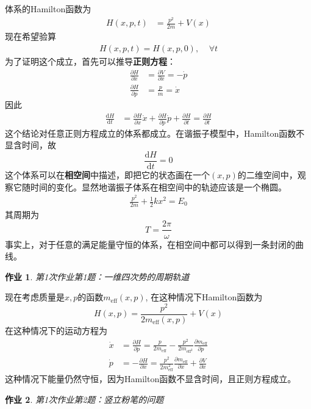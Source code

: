 \documentclass[12pt]{article}
\newtheorem{asg}{作业}
\begin{document}
体系的Hamilton函数为
\begin{align*}
    H(x,p,t) &= \frac {p^2}{2m} + V(x)
\end{align*}
现在希望验算
\begin{align*}
    H(x,p,t) = H(x,p,0),~~~~~\forall t
\end{align*}
为了证明这个成立，首先可以推导\textbf{正则方程}：
\begin{align*}
    \frac {\partial H}{\partial x} &= \frac {\partial V}{\partial x} = -\dot{p}\\
    \frac {\partial H}{\partial p} &= \frac pm = \dot{x}
\end{align*}
因此
\begin{align*}
    \frac {\mathrm{d}H}{\mathrm{d}t} &= \frac {\partial H}{\partial x} \dot{x} + \frac {\partial H}{\partial p} \dot{p} + \frac {\partial H}{\partial t} = \frac {\partial H}{\partial t}
\end{align*}
这个结论对任意正则方程成立的体系都成立。在谐振子模型中，Hamilton函数不显含时间，故
\begin{equation*}
    \frac {\mathrm{d}H}{\mathrm{d}t} = 0
\end{equation*}
这个体系可以在\textbf{相空间}中描述，即把它的状态画在一个$(x,p)$的二维空间中，观察它随时间的变化。显然地谐振子体系在相空间中的轨迹应该是一个椭圆。
\begin{align*}
    \frac {p^2}{2m} + \frac 12 kx^2 = E_0
\end{align*}
其周期为
\begin{equation*}
    T = \frac {2\pi}{\omega}
\end{equation*}
事实上，对于任意的满足能量守恒的体系，在相空间中都可以得到一条封闭的曲线。
\begin{asg}
    第1次作业第1题：一维四次势的周期轨道
\end{asg}

现在考虑质量是$x,p$的函数$m_\mathrm{eff}(x,p)$, 在这种情况下Hamilton函数为
\begin{equation*}
    H(x,p) = \frac {p^2}{2m_\mathrm{eff}(x,p)} + V(x)
\end{equation*}
在这种情况下的运动方程为
\begin{align*}
    \dot{x} &= \frac {\partial H}{\partial p} = \frac {p}{2m_{\mathrm{eff}}} - \frac {p^2}{2m_{\mathrm{eff}^2}} \frac {\partial m_\mathrm{eff}}{\partial p} \\
    \dot{p} &= -\frac {\partial H}{\partial x} = \frac {p^2}{2m_\mathrm{eff}^2} \frac {\partial m_\mathrm{eff}}{\partial x} + \frac {\partial V}{\partial x}
\end{align*}
这种情况下能量仍然守恒，因为Hamilton函数不显含时间，且正则方程成立。
\begin{asg}
    第1次作业第2题：竖立粉笔的问题
\end{asg}
\end{document}
